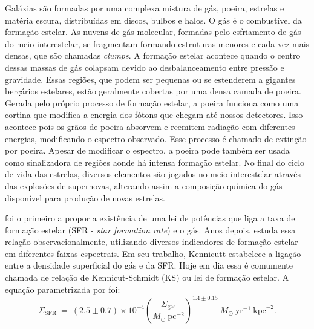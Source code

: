 Galáxias são formadas por uma complexa mistura de gás, poeira, estrelas e matéria escura,
distribuídas em discos, bulbos e halos. O gás é o combustível da formação estelar. As nuvens de gás
molecular, formadas pelo esfriamento de gás do meio interestelar, se fragmentam formando estruturas
menores e cada vez mais densas, que são chamadas {\em clumps}. A formação estelar acontece quando o
centro dessas massas de gás colapsam devido ao desbalanceamento entre pressão e gravidade. Essas
regiões, que podem ser pequenas ou se estenderem a gigantes berçários estelares, estão geralmente
cobertas por uma densa camada de poeira. Gerada pelo próprio processo de formação estelar, a poeira
funciona como uma cortina que modifica a energia dos fótons que chegam até nossos detectores. Isso
acontece pois os grãos de poeira absorvem e reemitem radiação com diferentes energias, modificando o
espectro observado. Esse processo é chamado de extinção por poeira. Apesar de modificar o espectro,
a poeira pode também ser usada como sinalizadora de regiões aonde há intensa formação estelar. No
final do ciclo de vida das estrelas, diversos elementos são jogados no meio interestelar através das
explosões de supernovas, alterando assim a composição química do gás disponível para produção de
novas estrelas.

\citet{Schmidt.1959a} foi o primeiro a propor a existência de uma lei de potências que liga a taxa
de formação estelar (SFR - {\em star formation rate}) e o gás. Anos depois, \citet{Kennicutt.1998a}
estuda essa relação observacionalmente, utilizando diversos indicadores de formação estelar em
diferentes faixas espectrais.
Em seu trabalho, Kennicutt estabelece a ligação entre a densidade superficial do gás e da SFR. Hoje
em dia essa é comumente chamada de relação de Kennicut-Schmidt (KS) ou lei de formação estelar. A
equação parametrizada por \citeauthor{Kennicutt.1998a} foi:
\begin{equation}
	\Sigma_{\mathrm{SFR}}\ =\ (2.5\pm0.7)\times 10^{-4} \left(\frac{\Sigma_{\mathrm{gas}}}{
M_\odot\ \mathrm{pc}^{-2}}\right)^{1.4 \pm 0.15}\ M_\odot\ \mathrm{yr}^{-1}\ \mathrm{kpc}^{-2}.
	\label{eq:SFRKennicutt}
\end{equation}

